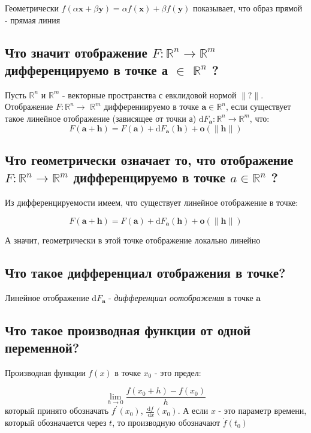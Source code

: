 \documentclass[a4paper]{article}
\begin{document}
Геометрически $f(\alpha \mathbf{x}+\beta \mathbf{y})=\alpha f(\mathbf{x})+\beta f(\mathbf{y})$ показывает, что образ прямой - прямая линия

\subsection{Что значит отображение $F: \mathbb{R}^{n} \rightarrow \mathbb{R}^{m}$ дифференцируемо в точке а $\in$ $\mathbb{R}^{n}$ ?}


Пусть $\mathbb{R}^{n}$ и $\mathbb{R}^{m}$ - векторные пространства с евклидовой нормой $\|?\|$. Отображение $F: \mathbb{R}^{n} \rightarrow$ $\mathbb{R}^{m}$ дифферениируемо в точке $\mathbf{a} \in \mathbb{R}^{n}$, если существует такое линейное отображение (зависящее от точки а) $\mathrm{d} F_{\mathbf{a}}: \mathbb{R}^{n} \rightarrow \mathbb{R}^{m}$, что:
$$
F(\mathbf{a}+\mathbf{h})=F(\mathbf{a})+\mathrm{d} F_{\mathbf{a}}(\mathbf{h})+\mathbf{o}(\|\mathbf{h}\|)
$$
\newpage
\subsection{Что геометрически означает то, что отображение $F: \mathbb{R}^{n} \rightarrow \mathbb{R}^{m}$ дифференцируемо в точке $a \in \mathbb{R}^{n}$ ?}

Из дифференцируемости имеем, что существует линейное отображение в точке:

$$
F(\mathbf{a}+\mathbf{h})=F(\mathbf{a})+\mathrm{d} F_{\mathbf{a}}(\mathbf{h})+\mathbf{o}(\|\mathbf{h}\|)
$$

А значит, геометрически в этой точке отображение локально линейно

\subsection{Что такое дифференциал отображения в точке?}

Линейное отображение d$F_\mathbf{a}$ - \textit{дифференциал оотображения} в точке $\mathbf{a}$

\subsection{Что такое производная функции от одной переменной?}

Производная функции $f(x)$ в точке $x_{0}$ - это предел:

$$
\lim\limits_{h \rightarrow 0} \frac{f\left(x_{0}+h\right)-f\left(x_{0}\right)}{h}
$$
который принято обозначать $f^{\prime}\left(x_{0}\right)$, $\frac{\mathrm{d} f}{\mathrm{~d} x}\left(x_{0}\right)$. А если $x$ - это параметр времени, который обозначается через $t$, то производную обозначают $\dot{f}\left(t_{0}\right)$
\end{document}
